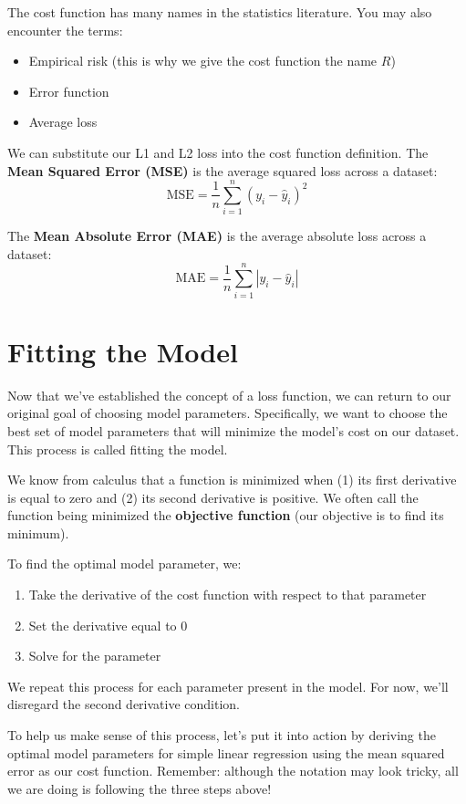\documentclass[
  letterpaper,
  DIV=11,
  numbers=noendperiod]{scrreprt}
\providecommand{\tightlist}{%
  \setlength{\itemsep}{0pt}\setlength{\parskip}{0pt}}\usepackage{longtable,booktabs,array}
\begin{document}
The cost function has many names in the statistics literature. You may
also encounter the terms:

\begin{itemize}
\tightlist
\item
  Empirical risk (this is why we give the cost function the name \(R\))
\item
  Error function
\item
  Average loss
\end{itemize}

We can substitute our L1 and L2 loss into the cost function definition.
The \textbf{Mean Squared Error (MSE)} is the average squared loss across
a dataset: \[\text{MSE} = \frac{1}{n} \sum_{i=1}^n (y_i - \hat{y}_i)^2\]

The \textbf{Mean Absolute Error (MAE)} is the average absolute loss
across a dataset:
\[\text{MAE}= \frac{1}{n} \sum_{i=1}^n |y_i - \hat{y}_i|\]

\section{Fitting the Model}\label{fitting-the-model}

Now that we've established the concept of a loss function, we can return
to our original goal of choosing model parameters. Specifically, we want
to choose the best set of model parameters that will minimize the
model's cost on our dataset. This process is called fitting the model.

We know from calculus that a function is minimized when (1) its first
derivative is equal to zero and (2) its second derivative is positive.
We often call the function being minimized the \textbf{objective
function} (our objective is to find its minimum).

To find the optimal model parameter, we:

\begin{enumerate}
\def\labelenumi{\arabic{enumi}.}
\tightlist
\item
  Take the derivative of the cost function with respect to that
  parameter
\item
  Set the derivative equal to 0
\item
  Solve for the parameter
\end{enumerate}

We repeat this process for each parameter present in the model. For now,
we'll disregard the second derivative condition.

To help us make sense of this process, let's put it into action by
deriving the optimal model parameters for simple linear regression using
the mean squared error as our cost function. Remember: although the
notation may look tricky, all we are doing is following the three steps
above!
\end{document}
